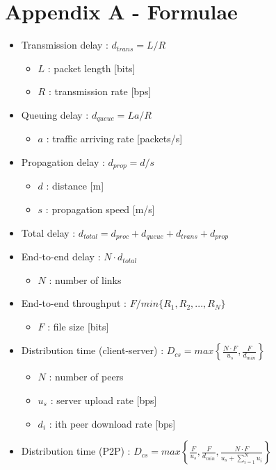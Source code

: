 \documentclass{article}
\begin{document}
\section{Appendix A - Formulae}
\begin{itemize}
    \item Transmission delay : $ d_{trans} = L/R $
    \begin{itemize}
        \item $ L $ : packet length [bits]
        \item $ R $ : transmission rate [bps]
    \end{itemize}
    \item Queuing delay : $ d_{queue} = La/R $
    \begin{itemize}
        \item $ a $ : traffic arriving rate [packets/s]
    \end{itemize}
    \item Propagation delay : $ d_{prop} = d/s $
    \begin{itemize}
        \item $ d $ : distance [m]
        \item $ s $ : propagation speed [m/s]
    \end{itemize}
    \item Total delay : $ d_{total} = d_{proc} + d_{queue} + d_{trans} + d_{prop}$ 
    \item End-to-end delay : $ N \cdot d_{total} $
    \begin{itemize}
        \item $ N $ : number of links
    \end{itemize}
    \item End-to-end throughput : $ F/min\{R_1, R_2, ..., R_N\} $
    \begin{itemize}
        \item $ F $ : file size [bits]
    \end{itemize}
    \item Distribution time (client-server) : $ D_{cs} = max \left\{\displaystyle\frac{N \cdot F}{u_s},\displaystyle\frac{F}{d_{min}}\right\} $
    \begin{itemize}
        \item $ N $ : number of peers
        \item $ u_s $ : server upload rate [bps]
        \item $ d_i $ : ith peer download rate [bps]
    \end{itemize}
    \item Distribution time (P2P) : $ D_{cs} = max \left\{\displaystyle\frac{F}{u_s},\displaystyle\frac{F}{d_{min}},\displaystyle\frac{N \cdot F}{u_s + \sum_{i=1}^N u_i}\right\} $

\end{itemize}
\end{document}
